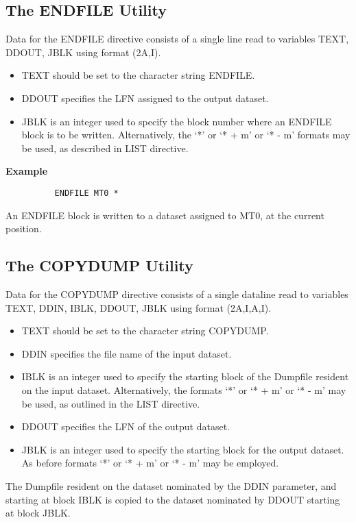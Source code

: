 \documentclass[11pt,fleqn]{article}
\begin{document}
\subsection{The ENDFILE Utility}

Data for the ENDFILE directive consists of a single line read to
variables TEXT, DDOUT, JBLK using format (2A,I).
\begin{itemize}
\item TEXT should be set to the character string ENDFILE.
\item DDOUT specifies the LFN assigned to the output
dataset.
\item JBLK is an integer used to specify the block number where an
ENDFILE block is to be written. Alternatively, the `*' or
`* + m' or `* - m' formats may be used, as described in
LIST directive.
\end{itemize}

{\bf Example}
{
\footnotesize
\begin{verbatim}
          ENDFILE MT0 *
\end{verbatim}
}

An ENDFILE block is written to a dataset assigned to MT0, at the
current position.


\subsection{The COPYDUMP Utility}

Data for the COPYDUMP directive consists of a single dataline read to
variables TEXT, DDIN, IBLK, DDOUT, JBLK using format (2A,I,A,I).
\begin{itemize}
\item  TEXT should be set to the character string COPYDUMP.
\item  DDIN specifies the file name of the input dataset.
\item  IBLK is an integer used to specify the starting block of the
Dumpfile resident on the input dataset. Alternatively,
the formats `*' or `* + m' or `* - m' may be used, as
outlined in the LIST directive.
\item  DDOUT specifies the LFN of the output dataset.
\item  JBLK is an integer used to specify the starting block for the
output dataset. As before formats `*' or `* + m' or
`* - m' may be employed.
\end{itemize}
The Dumpfile resident on the dataset nominated by the DDIN parameter,
and starting at block IBLK is copied to the dataset nominated by DDOUT
starting at block JBLK.\\
\end{document}
